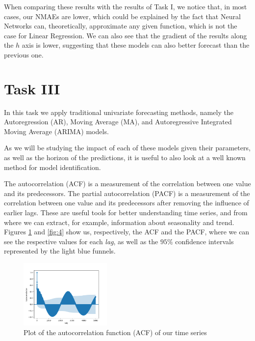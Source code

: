\documentclass[10pt]{article}
\begin{document}
When comparing these results with the results of Task I, we notice that, in most cases, our \textsc{NMAE}s are lower, which could be explained by the fact that Neural Networks can, theoretically, approximate any given function, which is not the case for Linear Regression.
We can also see that the gradient of the results along the $h$ axis is lower, suggesting that these models can also better forecast than the previous one.

\section*{Task III}
\label{sec:5}

In this task we apply traditional univariate forecasting methods, namely the Autoregression (AR), Moving Average (MA), and Autoregressive Integrated Moving Average (ARIMA) models.

As we will be studying the impact of each of these models given their parameters, as well as the horizon of the predictions, it is useful to also look at a well known method for model identification. 

The autocorrelation (ACF) is a measurement of the correlation between one value and its predecessors. The partial autocorrelation (PACF) is a measurement of the correlation between one value and its predecessors after removing the influence of earlier lags. These are useful tools for better understanding time series, and from where we can extract, for example, information about seasonality and trend. Figures \ref{fig:3} and \ref{fig:4} show us, respectively, the ACF and the PACF, where we can see the respective values for each \textit{lag}, as well as the $95\%$ confidence intervals represented by the light blue funnels.

\begin{figure}[!ht]
    \centering
    \includegraphics[width=0.40\textwidth,height=\textheight,keepaspectratio]{../acf.png}
    \caption{Plot of the autocorrelation function (ACF) of our time series}
    \label{fig:3}
\end{figure}
\end{document}
